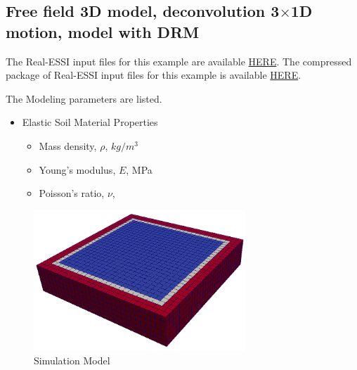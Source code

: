 \clearpage
\newpage
\subsection{Free field 3D model, deconvolution  3$\times$1D motion, model with DRM}
\label{Free_fields_3D_model_with_DRM2}

The Real-ESSI input files for this example are available 
\href{https://github.com/yuan-energy/Real-ESSI-Short-Course-Examples/tree/master/short-course-examples/Day2/Deconvolution_3by1D_Motions/Free_fields_3D_model_with_DRM}{HERE}. 
The compressed package of Real-ESSI input files for this example is available 
\href{https://github.com/yuan-energy/Real-ESSI-Short-Course-Examples/blob/master/short-course-examples/Day2/Deconvolution_3by1D_Motions/Free_fields_3D_model_with_DRM/Free_fields_3D_model_with_DRM.tgz?raw=true}{HERE}. 

The Modeling parameters are listed.
\begin{itemize}
  \item Elastic Soil Material Properties 
  \begin{itemize}
    \item Mass density, $\rho$, \enspace {} $kg/m^3$
    \item Young's modulus, $E$, \enspace {} MPa
    \item Poisson's ratio, $\nu$, \enspace {}
  \end{itemize}
\end{itemize}


\begin{figure}[H]
  \centering
  \includegraphics[width = 8cm]{./Figure-files/Day2/Deconvolution_3by1D_Motions/Free_fields_3D_model_with_DRM/overview.png}
  \caption{Simulation Model}
  \label{fig_decon_3by1D_motion_3D_model}
\end{figure}

